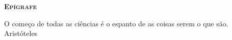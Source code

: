 
\vspace*{45pt}
\begin{flushleft}
	{\Large \textbf{\scshape{Ep\'{\i}grafe}}}
\end{flushleft}
\vspace*{10pt}

\begin{flushright}
	O começo de todas as ciências é o espanto de as coisas serem o que são. \\
	Aristóteles
\end{flushright}

